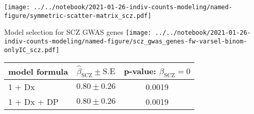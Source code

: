 \documentclass[usenames,dvipsnames]{beamer}
\begin{document}
\begin{frame}
\texttt{[image: ../../notebook/2021-01-26-indiv-counts-modeling/named-figure/symmetric-scatter-matrix\_scz.pdf]}
\end{frame}

%

\begin{frame}{Model selection for SCZ GWAS genes}
\small
\texttt{[image: ../../notebook/2021-01-26-indiv-counts-modeling/named-figure/scz\_gwas\_genes-fw-varsel-binom-onlyIC\_scz.pdf]}

\begin{center}
\tiny
\begin{tabular}{l|cc}
model formula & \(\hat{\beta}_\mathrm{SCZ} \pm \mathrm{S.E}\) & p-value: \(\beta_\mathrm{SCZ} = 0\) \\
\hline
1 + Dx & \(0.80 \pm 0.26\) & 0.0019 \\
1 + Dx + DP & \(0.80 \pm 0.26\) & 0.0019 \\
\end{tabular}
\end{center}
\end{frame}
\end{document}
